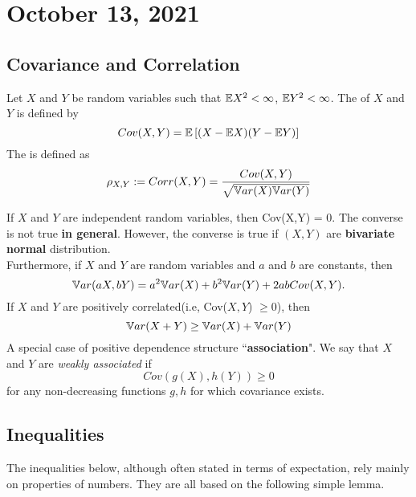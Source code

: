 \section{October 13, 2021}
\subsection{Covariance and Correlation}

\begin{definition}
    Let $X$ and $Y$ be random variables such that $\mathbb E X^2 < \infty$, $\mathbb E Y^2 < \infty$. The  of $X$ and $Y$ is defined by
    $$
    Cov(X,Y) = 
    \mathbb E
    \left[(X - \mathbb E X)(Y-\mathbb E Y) \right]
    $$
    The  is defined as
    $$
    \rho_{X,Y} := Corr(X,Y) = 
    \frac{Cov(X,Y)}{\sqrt{\mathbb V ar(X)\mathbb V ar(Y)}}
    $$
    
\end{definition}
If $X$ and $Y$ are independent random variables, then Cov(X,Y) = 0. The converse is not true \textbf{in general}. However, the converse is true if $(X,Y)$ are \textbf{bivariate normal} distribution. 
\\
Furthermore, if $X$ and $Y$ are random variables and $a$ and $b$ are constants, then
$$
\mathbb V ar(aX, bY) = a^2 \mathbb V ar(X) + b^2 \mathbb V ar(Y) + 2ab Cov(X,Y).
$$
 If $X$ and $Y$ are positively correlated(i.e, Cov($X,Y$) $\geq 0$), then 
$$
\mathbb V ar(X +Y) \geq \mathbb V ar(X) + \mathbb V ar(Y)
$$
 A special case of positive dependence structure ``\textbf{association}". We say that $X$ and $Y$ are \textit{weakly associated} if
$$
Cov(g(X),h(Y)) \geq 0
$$
for any non-decreasing functions $g,h$ for which covariance exists.

\subsection{Inequalities}
The inequalities below, although often stated in terms of expectation, rely mainly on properties of numbers. They are all based on the following simple lemma.

